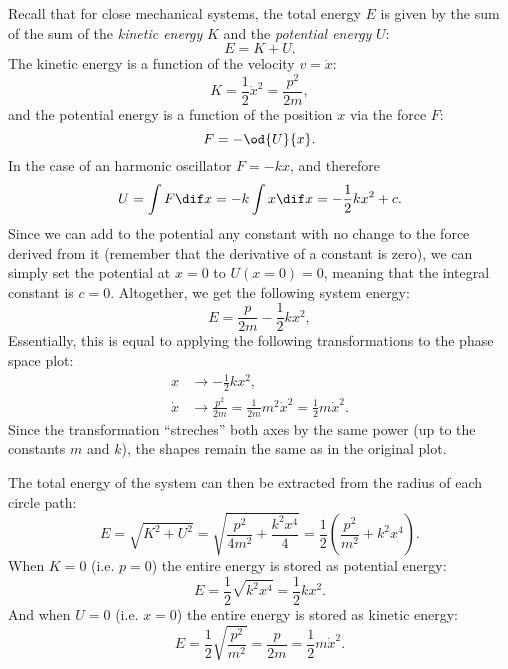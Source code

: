 Recall that for close mechanical systems, the total energy $E$ is given by the sum of the sum of the \textit{kinetic energy} $K$ and the \textit{potential energy} $U$:
\begin{equation}
  E = K + U.
  \label{eq:total_energy}
\end{equation}
The kinetic energy is a function of the velocity $v=\dot{x}$:
\begin{equation}
  K = \frac{1}{2}\dot{x}^{2} = \frac{p^{2}}{2m},
  \label{eq:kinetric_energy}
\end{equation}
and the potential energy is a function of the position $x$ via the force $F$:
\begin{equation}
  F = -\od{U}{x}.
  \label{eq:force_from_potential}
\end{equation}
In the case of an harmonic oscillator $F=-kx$, and therefore
\begin{equation}
  U = \int\displaystyle F \dif x = -k\int\displaystyle x \dif x = -\frac{1}{2}kx^{2} + c.
  \label{eq:potential_energy_harmonic_oscillator}
\end{equation}
Since we can add to the potential any constant with no change to the force derived from it (remember that the derivative of a constant is zero), we can simply set the potential at $x=0$ to $U\left(x=0\right)=0$, meaning that the integral constant is $c=0$. Altogether, we get the following system energy:
\begin{equation}
  E = \frac{p}{2m} - \frac{1}{2}kx^{2},
  \label{eq:total_energy_harmonic_oscillator}
\end{equation}
Essentially, this is equal to applying the following transformations to the phase space plot:
\begin{align}
  x &\to -\frac{1}{2}kx^{2},\\
  \dot{x} &\to \frac{p^{2}}{2m} = \frac{1}{2m}{m^{2}\dot{x}^{2}} = \frac{1}{2}m\dot{x}^{2}.
\end{align}
Since the transformation \enquote{streches} both axes by the same power (up to the constants $m$ and $k$), the shapes remain the same as in the original plot.

The total energy of the system can then be extracted from the radius of each circle path:
\begin{equation}
  E = \sqrt{K^{2}+U^{2}} = \sqrt{\frac{p^{2}}{4m^{2}} + \frac{k^{2}x^{4}}{4}} = \frac{1}{2}\left(\frac{p^{2}}{m^{2}}+k^{2}x^{4}\right).
  \label{eq:label}
\end{equation}
When $K=0$ (i.e. $p=0$) the entire energy is stored as potential energy:
\begin{equation}
  E = \frac{1}{2}\sqrt{k^{2}x^{4}} = \frac{1}{2}kx^{2}.
  \label{eq:label}
\end{equation}
And when $U=0$ (i.e. $x=0$) the entire energy is stored as kinetic energy:
\begin{equation}
  E = \frac{1}{2}\sqrt{\frac{p^{2}}{m^{2}}} = \frac{p}{2m} = \frac{1}{2}m\dot{x}^{2}.
  \label{eq:label}
\end{equation}

